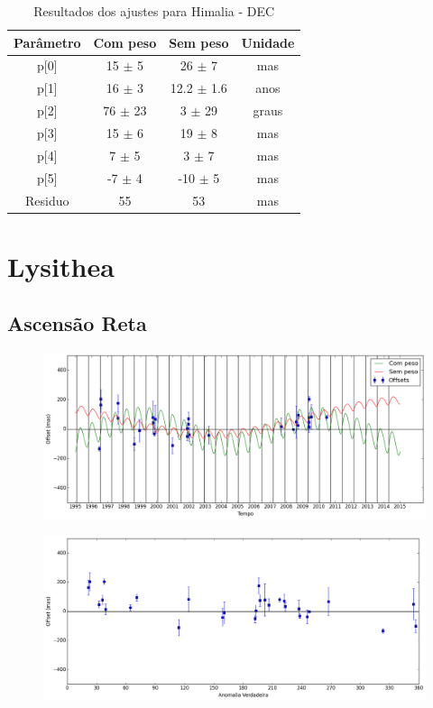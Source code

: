 \documentclass[11pt,a4paper]{report}
\begin{document}
\begin{table}[h!]
\caption{\label{Tab: Himalia-DEC} Resultados dos ajustes para Himalia - DEC}
\begin{centering}
\begin{tabular}{cccc}
\hline
\hline
Parâmetro & Com peso & Sem peso & Unidade\tabularnewline
\hline
p[0] & 15 $\pm$ 5 & 26 $\pm$ 7 & mas\\
p[1] & 16 $\pm$ 3 & 12.2 $\pm$ 1.6 & anos\\
p[2] & 76 $\pm$ 23 & 3 $\pm$ 29 & graus\\
p[3] & 15 $\pm$ 6 & 19 $\pm$ 8 & mas\\
p[4] & 7 $\pm$ 5 & 3 $\pm$ 7 & mas\\
p[5] & -7 $\pm$ 4 & -10 $\pm$ 5 & mas\\
Residuo & 55 & 53 & mas\\
\hline 
\end{tabular} 
\par\end{centering}
\end{table}

\chapter*{Lysithea}
\section*{Ascensão Reta}

\begin{figure}[h]
\includegraphics[scale=0.45]{Lysithea/RA.png} 
\end{figure}

\begin{figure}[h]
\includegraphics[scale=0.45]{Lysithea/RA_anom.png}  
\end{figure}
\end{document}
